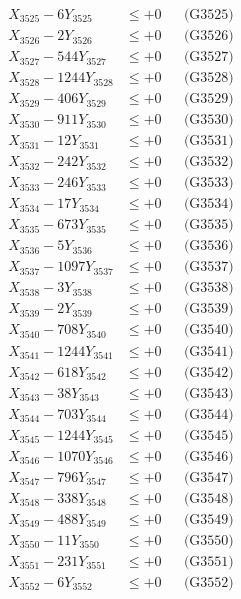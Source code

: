 \documentclass[a4paper,10pt]{article}
\begin{document}
{\begin{align}
X_{3525} - 6Y_{3525} &\leq +0 && \text{(G3525)} \\
X_{3526} - 2Y_{3526} &\leq +0 && \text{(G3526)} \\
X_{3527} - 544Y_{3527} &\leq +0 && \text{(G3527)} \\
X_{3528} - 1244Y_{3528} &\leq +0 && \text{(G3528)} \\
X_{3529} - 406Y_{3529} &\leq +0 && \text{(G3529)} \\
X_{3530} - 911Y_{3530} &\leq +0 && \text{(G3530)} \\
\allowbreak
X_{3531} - 12Y_{3531} &\leq +0 && \text{(G3531)} \\
X_{3532} - 242Y_{3532} &\leq +0 && \text{(G3532)} \\
X_{3533} - 246Y_{3533} &\leq +0 && \text{(G3533)} \\
X_{3534} - 17Y_{3534} &\leq +0 && \text{(G3534)} \\
X_{3535} - 673Y_{3535} &\leq +0 && \text{(G3535)} \\
X_{3536} - 5Y_{3536} &\leq +0 && \text{(G3536)} \\
X_{3537} - 1097Y_{3537} &\leq +0 && \text{(G3537)} \\
X_{3538} - 3Y_{3538} &\leq +0 && \text{(G3538)} \\
X_{3539} - 2Y_{3539} &\leq +0 && \text{(G3539)} \\
X_{3540} - 708Y_{3540} &\leq +0 && \text{(G3540)} \\
\allowbreak
X_{3541} - 1244Y_{3541} &\leq +0 && \text{(G3541)} \\
X_{3542} - 618Y_{3542} &\leq +0 && \text{(G3542)} \\
X_{3543} - 38Y_{3543} &\leq +0 && \text{(G3543)} \\
X_{3544} - 703Y_{3544} &\leq +0 && \text{(G3544)} \\
X_{3545} - 1244Y_{3545} &\leq +0 && \text{(G3545)} \\
X_{3546} - 1070Y_{3546} &\leq +0 && \text{(G3546)} \\
X_{3547} - 796Y_{3547} &\leq +0 && \text{(G3547)} \\
X_{3548} - 338Y_{3548} &\leq +0 && \text{(G3548)} \\
X_{3549} - 488Y_{3549} &\leq +0 && \text{(G3549)} \\
X_{3550} - 11Y_{3550} &\leq +0 && \text{(G3550)} \\
\allowbreak
X_{3551} - 231Y_{3551} &\leq +0 && \text{(G3551)} \\
X_{3552} - 6Y_{3552} &\leq +0 && \text{(G3552)} \\

\end{align}}
\end{document}

